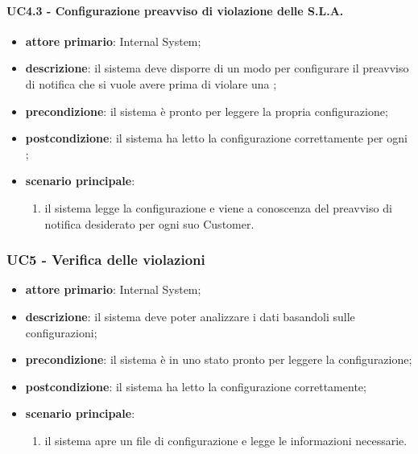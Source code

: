 \paragraph{UC4.3 - Configurazione preavviso di violazione delle S.L.A.}
\begin{itemize}
	\item \textbf{attore primario}: Internal System;
	\item \textbf{descrizione}: il sistema deve disporre di un modo per configurare il preavviso di notifica che si vuole avere prima di violare una ;
	\item \textbf{precondizione}: il sistema è pronto per leggere la propria configurazione;
	\item \textbf{postcondizione}: il sistema ha letto la configurazione correttamente per ogni ; 
	\item \textbf{scenario principale}: 
	\begin{enumerate}
		\item il sistema legge la configurazione e viene a conoscenza del preavviso di notifica desiderato per ogni suo Customer.
	\end{enumerate}
\end{itemize}

\subsubsection{UC5 - Verifica delle violazioni}
\begin{itemize}
	\item \textbf{attore primario}: Internal System;
	\item \textbf{descrizione}: il sistema deve poter analizzare i dati basandoli sulle configurazioni;
	\item \textbf{precondizione}: il sistema è in uno stato pronto per leggere la configurazione;
	\item \textbf{postcondizione}: il sistema ha letto la configurazione correttamente;
	\item \textbf{scenario principale}: 
	\begin{enumerate}
		\item il sistema apre un file di configurazione e legge le informazioni necessarie.
	\end{enumerate}
\end{itemize}
